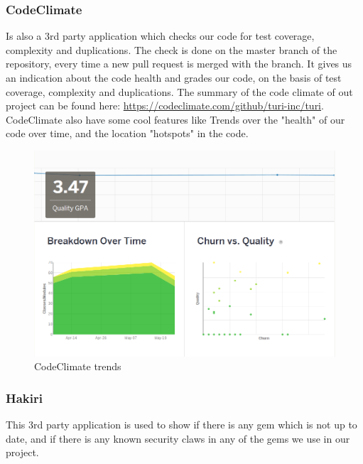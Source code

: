 \documentclass[a4paper]{article}
\begin{document}
\subsubsection{CodeClimate}
Is also a 3rd party application which checks our code for test coverage, complexity and duplications. The check is done on the master branch of the repository, every time a new pull request is merged with the branch. It gives us an indication about the code health and grades our code, on the basis of test coverage, complexity and duplications. The summary of the code climate of out project can be found here: \url{https://codeclimate.com/github/turi-inc/turi}. \\
CodeClimate also have some cool features like Trends over the "health" of our code over time, and the location "hotspots" in the code.  

\begin{figure}
  \begin{center}
    \includegraphics[scale=0.45]{pictures/trends_code.png}
    \caption{CodeClimate trends}
    \label{fig:}
  \end{center}
\end{figure}

\subsubsection{Hakiri}
This 3rd party application is used to show if there is any gem which is not up to date, and if there is any known security claws in any of the gems we use in our project.


\end{document}
